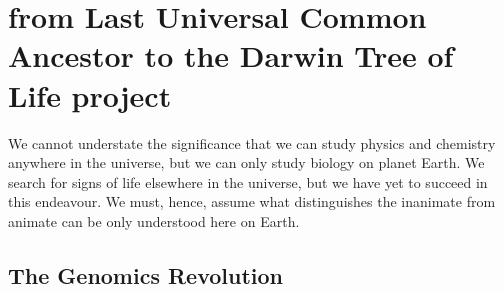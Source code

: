 
\chapter{from Last Universal Common Ancestor to the Darwin Tree of Life project}  %

\ifpdf
    \graphicspath{{Chapter1/Figs/Raster/}{Chapter1/Figs/PDF/}{Chapter1/Figs/}}
\else
    \graphicspath{{Chapter1/Figs/Vector/}{Chapter1/Figs/}}
\fi



We cannot understate the significance that we can study physics and chemistry anywhere in the universe, but we can only study biology on planet Earth. We search for signs of life elsewhere in the universe, but we have yet to succeed in this endeavour. We must, hence, assume what distinguishes the inanimate from animate can be only understood here on Earth. 

\section{The Genomics Revolution}

%
%

